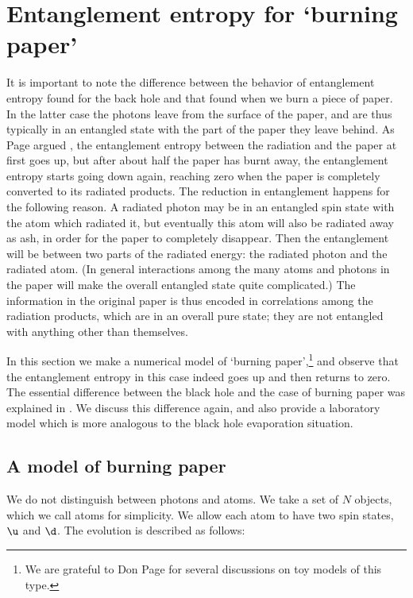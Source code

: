 \documentclass[11pt]{article}
\begin{document}
\section{Entanglement entropy for `burning paper'}\label{burn}

It is important to note the difference between the behavior of entanglement entropy found for  the back hole and that found when we burn a piece of paper. In the latter case the photons leave from the surface of the paper, and are thus typically in an entangled state with the 
part of the paper they leave behind. As Page argued \cite{page}, the entanglement entropy between the radiation and the paper at first goes up, but after about half the paper has burnt away, the entanglement entropy starts going down again, reaching zero when the paper is completely converted to its radiated products. The reduction in entanglement happens for the following reason. A radiated photon may be in an entangled spin state with the atom which radiated it, but eventually this atom will also be radiated away as ash, in order for the paper to completely disappear. Then the entanglement will be between two parts of the radiated energy: the radiated photon and the radiated atom. (In general interactions among the many atoms and photons in the paper will make the overall entangled state quite complicated.) The information in the original paper is thus encoded in correlations among the radiation products, which are in an overall pure state; they are not entangled with anything other than themselves.

In this section we make a numerical model of `burning paper',\footnote{We are grateful to Don Page for several discussions on toy models of this type.} and observe that the entanglement entropy in this case indeed goes up and then returns to zero. The essential difference between the black hole and the case of burning paper was explained in \cite{mathurfuzz}. We discuss this difference again, and also provide a laboratory model which is more analogous to the black hole evaporation situation.

\subsection{A model of burning paper}\label{subfour}


We do not distinguish between photons and atoms. We take a set of $N$ objects, which we call atoms for simplicity. We allow each atom to have two spin states, $\u$ and $\d$. The evolution is described as follows:
\end{document}
